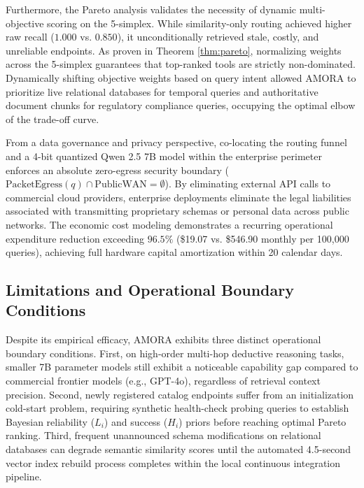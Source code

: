 \documentclass[conference,onecolumn,10pt]{IEEEtran}
\begin{document}
Furthermore, the Pareto analysis validates the necessity of dynamic multi-objective scoring on the 5-simplex. While similarity-only routing achieved higher raw recall ($1.000$ vs. $0.850$), it unconditionally retrieved stale, costly, and unreliable endpoints. As proven in Theorem \ref{thm:pareto}, normalizing weights across the 5-simplex guarantees that top-ranked tools are strictly non-dominated. Dynamically shifting objective weights based on query intent allowed AMORA to prioritize live relational databases for temporal queries and authoritative document chunks for regulatory compliance queries, occupying the optimal elbow of the trade-off curve.

From a data governance and privacy perspective, co-locating the routing funnel and a 4-bit quantized Qwen 2.5 7B model within the enterprise perimeter enforces an absolute zero-egress security boundary ($\text{PacketEgress}(q) \cap \text{PublicWAN} = \emptyset$). By eliminating external API calls to commercial cloud providers, enterprise deployments eliminate the legal liabilities associated with transmitting proprietary schemas or personal data across public networks. The economic cost modeling demonstrates a recurring operational expenditure reduction exceeding $96.5\%$ (\$19.07 vs. \$546.90 monthly per 100,000 queries), achieving full hardware capital amortization within 20 calendar days.

\subsection{Limitations and Operational Boundary Conditions}
Despite its empirical efficacy, AMORA exhibits three distinct operational boundary conditions. First, on high-order multi-hop deductive reasoning tasks, smaller 7B parameter models still exhibit a noticeable capability gap compared to commercial frontier models (e.g., GPT-4o), regardless of retrieval context precision. Second, newly registered catalog endpoints suffer from an initialization cold-start problem, requiring synthetic health-check probing queries to establish Bayesian reliability ($L_i$) and success ($H_i$) priors before reaching optimal Pareto ranking. Third, frequent unannounced schema modifications on relational databases can degrade semantic similarity scores until the automated 4.5-second vector index rebuild process completes within the local continuous integration pipeline.
\end{document}
